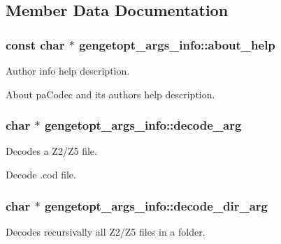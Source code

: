 \subsection{Member Data Documentation}
\hypertarget{structgengetopt__args__info_aa34aa7a314743acdbe4c5fdbc95239b3}{}
\subsubsection[{about\+\_\+help}]{\setlength{\rightskip}{0pt plus 5cm}const char $\ast$ gengetopt\+\_\+args\+\_\+info\+::about\+\_\+help}\label{structgengetopt__args__info_aa34aa7a314743acdbe4c5fdbc95239b3}


Author info help description. 

About pa\+Codec and its authors help description. \hypertarget{structgengetopt__args__info_a206c402ceafa179717ab062a22d33195}{}
\subsubsection[{decode\+\_\+arg}]{\setlength{\rightskip}{0pt plus 5cm}char $\ast$ gengetopt\+\_\+args\+\_\+info\+::decode\+\_\+arg}\label{structgengetopt__args__info_a206c402ceafa179717ab062a22d33195}


Decodes a Z2/\+Z5 file. 

Decode .cod file. \hypertarget{structgengetopt__args__info_a60e3abd0a9d89e3d8967900ce8039731}{}
\subsubsection[{decode\+\_\+dir\+\_\+arg}]{\setlength{\rightskip}{0pt plus 5cm}char $\ast$ gengetopt\+\_\+args\+\_\+info\+::decode\+\_\+dir\+\_\+arg}\label{structgengetopt__args__info_a60e3abd0a9d89e3d8967900ce8039731}


Decodes recursivally all Z2/\+Z5 files in a folder. 

